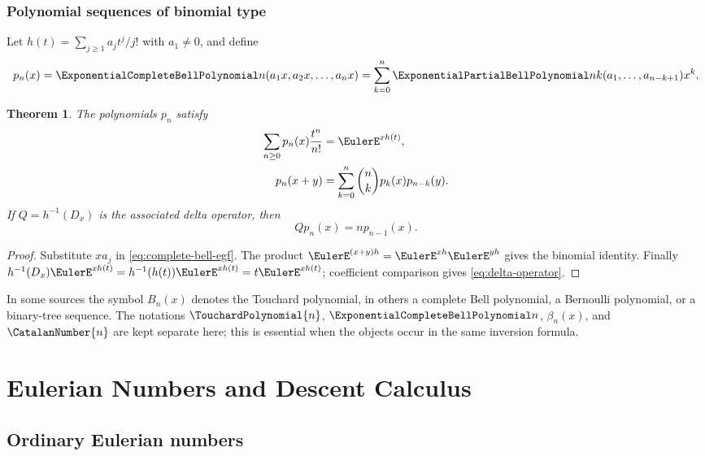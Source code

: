 \documentclass[11pt,a4paper,oneside,openany]{book}
\newtheorem{theorem}{Theorem}[chapter]
\theoremstyle{definition}
\theoremstyle{remark}
\begin{document}
\section{Polynomial sequences of binomial type}
Let
$h(t)=\sum_{j\ge1}a_jt^j/j!$ with $a_1\ne0$, and define
\begin{equation}\label{eq:binomial-type-bell}
 p_n(x)=\ExponentialCompleteBellPolynomial n(a_1x,a_2x,\ldots,a_nx)
 =\sum_{k=0}^{n}\ExponentialPartialBellPolynomial nk(a_1,\ldots,a_{n-k+1})x^k.
\end{equation}

\begin{theorem}\label{thm:binomial-type-bell}
The polynomials $p_n$ satisfy
\begin{align}
 \sum_{n\ge0}p_n(x)\frac{t^n}{n!}&=\EulerE^{xh(t)},
 \label{eq:binomial-type-egf}\\
 p_n(x+y)&=\sum_{k=0}^{n}\binom nkp_k(x)p_{n-k}(y).
 \label{eq:binomial-type-identity}
\end{align}
If $Q=h^{-1}(D_x)$ is the associated delta operator, then
\begin{equation}\label{eq:delta-operator}
 Qp_n(x)=np_{n-1}(x).
\end{equation}
\end{theorem}
\begin{proof}
Substitute $x a_j$ in \eqref{eq:complete-bell-egf}.  The product
$\EulerE^{(x+y)h}=\EulerE^{xh}\EulerE^{yh}$ gives the binomial identity.  Finally
$h^{-1}(D_x)\EulerE^{xh(t)}=h^{-1}(h(t))\EulerE^{xh(t)}=t \EulerE^{xh(t)}$; coefficient comparison
gives \eqref{eq:delta-operator}.
\end{proof}

\begin{auditbox}
In some sources the symbol $B_n(x)$ denotes the Touchard polynomial, in others a
complete Bell polynomial, a Bernoulli polynomial, or a binary-tree sequence.  The
notations $\TouchardPolynomial{n}$, $\ExponentialCompleteBellPolynomial n$, $\beta_n(x)$, and $\CatalanNumber{n}$ are kept separate here; this
is essential when the objects occur in the same inversion formula.
\end{auditbox}

\part{Eulerian Numbers and Descent Calculus}

\chapter{Ordinary Eulerian numbers}
\end{document}
